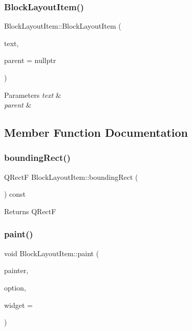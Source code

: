 \subsubsection{\texorpdfstring{BlockLayoutItem()}{BlockLayoutItem()}}
{\footnotesize\ttfamily Block\+Layout\+Item\+::\+Block\+Layout\+Item (\begin{DoxyParamCaption}\item[{const std\+::string \&}]{text,  }\item[{Q\+Graphics\+Item $\ast$}]{parent = {\ttfamily nullptr} }\end{DoxyParamCaption})}


\begin{DoxyParams}{Parameters}
{\em text} & \\
\hline
{\em parent} & \\
\hline
\end{DoxyParams}


\subsection{Member Function Documentation}
\mbox{\label{class_block_layout_item_a6de4f93c0a2cdcccd5fe9f94f1769906}} 
\subsubsection{\texorpdfstring{boundingRect()}{boundingRect()}}
{\footnotesize\ttfamily Q\+RectF Block\+Layout\+Item\+::bounding\+Rect (\begin{DoxyParamCaption}{ }\end{DoxyParamCaption}) const}

\begin{DoxyReturn}{Returns}
Q\+RectF 
\end{DoxyReturn}
\mbox{\label{class_block_layout_item_a418628ab57eed9f9e9857f1a33149c54}} 
\subsubsection{\texorpdfstring{paint()}{paint()}}
{\footnotesize\ttfamily void Block\+Layout\+Item\+::paint (\begin{DoxyParamCaption}\item[{Q\+Painter $\ast$}]{painter,  }\item[{const Q\+Style\+Option\+Graphics\+Item $\ast$}]{option,  }\item[{Q\+Widget $\ast$}]{widget = {} }\end{DoxyParamCaption})}


